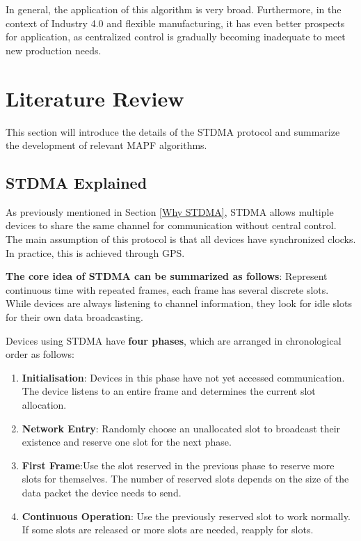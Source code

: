\documentclass[12pt, oneside]{article}
\begin{document}
    In general, the application of this algorithm is very broad. Furthermore, in the context of Industry 4.0 and flexible manufacturing, it has even better prospects for application\cite{Industry_41,Industry_42,Industry_43}, as centralized control is gradually becoming inadequate to meet new production needs.
\pagebreak

\section{Literature Review}
\label{LiteratureReview}

This section will introduce the details of the STDMA\cite{STDMA} protocol and summarize the development of relevant MAPF algorithms.
\subsection{STDMA Explained}
\label{STDMA_Explained}


As previously mentioned in Section \ref{Why STDMA}, STDMA\cite{STDMA} allows multiple devices to share the same channel for communication without central control. The main assumption of this protocol is that all devices have synchronized clocks. In practice, this is achieved through GPS\cite{STDMA_2}.

\textbf{The core idea of STDMA can be summarized as follows}: Represent continuous time with repeated frames, each frame has several discrete slots. While devices are always listening to channel information, they look for idle slots for their own data broadcasting.



Devices using STDMA have \textbf{four phases}, which are arranged in chronological order as follows:

\begin{enumerate}
    \item \textbf{Initialisation}: Devices in this phase have not yet accessed communication. The device listens to an entire frame and determines the current slot allocation.
    \item \textbf{Network Entry}:  Randomly choose an unallocated slot to broadcast their existence and reserve one slot for the next phase.
    \item \textbf{First Frame}:Use the slot reserved in the previous phase to reserve more slots for themselves. The number of reserved slots depends on the size of the data packet the device needs to send.
    \item \textbf{Continuous Operation}: Use the previously reserved slot to work normally. If some slots are released or more slots are needed, reapply for slots.
\end{enumerate}
\end{document}
